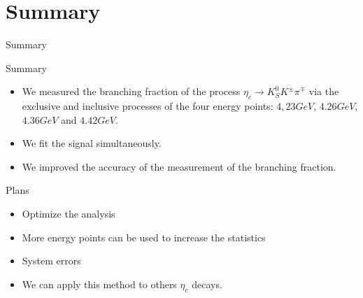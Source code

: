 \documentclass{beamer}
\begin{document}
\section{Summary}
\begin{frame}{Summary}
    \begin{block}{Summary}
        \begin{itemize}
            \item We measured the branching fraction of the process $\eta_c\to K_S^0 K^{\pm} \pi^{\mp}$ via the exclusive and inclusive processes of the four energy points: $4,23 GeV$, $4.26 GeV$, $4.36 GeV$ and $4.42 GeV$.
            \item We fit the signal simultaneously.
            \item We improved the accuracy of the measurement of the branching fraction.
        \end{itemize}
    \end{block}
    \begin{block}{Plans}
        \begin{itemize}
            \item Optimize the analysis
            \item More energy points can be used to increase the statistics
            \item System errors
            \item We can apply this method to others $\eta_c$ decays.
        \end{itemize}
    \end{block}
\end{frame}
\end{document}
